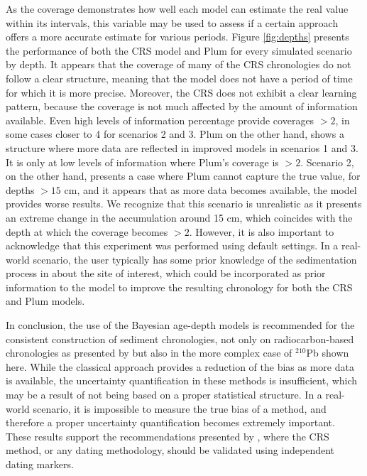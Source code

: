 \documentclass [10pt] {article}
\begin{document}
As the coverage demonstrates how well each model can estimate the real value within its intervals, this variable may be used to assess if a certain approach offers a more accurate estimate for various periods.
Figure \ref{fig:depths} presents the performance of both the CRS model and Plum for every simulated scenario by depth.
It appears that the coverage of many of the CRS chronologies do not follow a clear structure, meaning that the model does not have a period of time for which it is more precise. 
Moreover, the CRS does not exhibit a clear learning pattern, because the coverage is not much affected by the amount of information available.
Even high levels of information percentage provide coverages $> 2$, in some cases closer to 4 for scenarios 2 and 3.
Plum on the other hand, shows a structure where more data are reflected in improved models in scenarios 1 and 3.
It is only at low levels of information where Plum's coverage is $>2$.
Scenario 2, on the other hand, presents a case where Plum cannot capture the true value, for depths $>15$ cm, and it appears that as more data becomes available, the model provides worse results. 
We recognize that this scenario is unrealistic as it presents an extreme change in the accumulation around 15 cm, which coincides with the depth at which the coverage becomes $>2$.
However, it is also important to acknowledge that this experiment was performed using default settings.  
In a real-world scenario, the user typically has some prior knowledge of the sedimentation process in about the site of interest, which could be incorporated as prior information to the model to improve the resulting chronology for both the CRS and Plum models.


In conclusion, the use of the Bayesian age-depth models is recommended for the consistent construction of sediment chronologies, not only on radiocarbon-based chronologies as presented by \citet{Blaauw2018} but also in the more complex case of $^{210}$Pb shown here.
While the classical approach provides a reduction of the bias as more data is available, the uncertainty quantification in these methods is insufficient, which may be a result of not being based on a proper statistical structure. 
In a real-world scenario, it is impossible to measure the true bias of a method, and therefore a proper uncertainty quantification becomes extremely important.
These results support the recommendations presented by \citet{Smith2001,Barsanti2020}, where the CRS method, or any dating methodology, should be validated using independent dating markers. 
\end{document}
